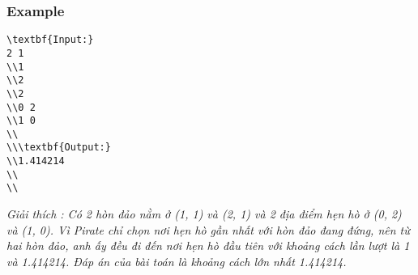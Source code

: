 \subsubsection{   Example  }
\begin{verbatim}
\textbf{Input:}
2 1 
\\1 
\\2
\\2
\\0 2
\\1 0
\\
\\\textbf{Output:}
\\1.414214
\\
\\\end{verbatim}



\emph{     Giải thích        : Có 2 hòn đảo nằm ở (1, 1) và (2, 1) và 2 địa điểm hẹn hò ở (0, 2) và (1, 0). Vì Pirate chỉ chọn nơi hẹn hò gần nhất với hòn đảo đang đứng, nên từ hai hòn đảo, anh ấy đều đi đến nơi hẹn hò đầu tiên với khoảng cách lần lượt là 1 và 1.414214. Đáp án của bài toán là khoảng cách lớn nhất 1.414214.    
\\}
